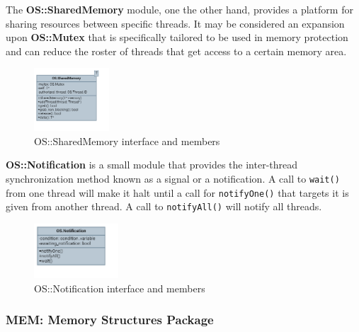 The \textbf{OS::SharedMemory} module, one the other hand, provides a platform for sharing resources between specific threads. It may be considered an expansion upon \textbf{OS::Mutex} that is specifically tailored to be used in memory protection and can reduce the roster of threads that get access to a certain memory area. 


\begin{figure}[H]
	\centering
	\includegraphics[width=0.25\textwidth]{./img/navig-class-sharedmemory.png}
	\caption {OS::SharedMemory interface and members}
	\label{fig:navig-class-sharedmemory}
	\end{figure}


\textbf{OS::Notification} is a small module that provides the inter-thread synchronization method known as a signal or a notification. A call to \texttt{wait()} from one thread will make it halt until a call for \texttt{notifyOne()} that targets it is given from another thread. A call to \texttt{notifyAll()} will notify all threads. 


\begin{figure}[H]
	\centering
	\includegraphics[width=0.28\textwidth]{./img/navig-class-notification.png}
	\caption {OS::Notification interface and members}
	\label{fig:navig-class-notification}
	\end{figure}


\subsubsection{MEM: Memory Structures Package}

